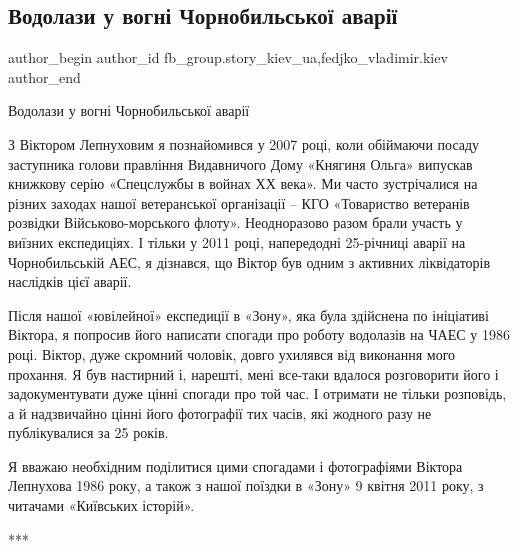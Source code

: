  
 
 
 
 
 
\subsection{Водолази у вогні Чорнобильської аварії}
\label{sec:02_12_2021.fb.fb_group.story_kiev_ua.1.vodolazy_chernobyl}
 
\ifcmt
 author_begin
   author_id fb_group.story_kiev_ua,fedjko_vladimir.kiev
 author_end
\fi

Водолази у вогні Чорнобильської аварії

З Віктором Лепнуховим я познайомився у 2007 році, коли обіймаючи посаду
заступника голови правління Видавничого Дому «Княгиня Ольга» випускав книжкову
серію «Спецслужбы в войнах ХХ века». Ми часто зустрічалися на різних заходах
нашої ветеранської організації – КГО «Товариство ветеранів розвідки
Військово-морського флоту». Неодноразово разом брали участь у виїзних
експедиціях. І тільки у 2011 році, напередодні 25-річниці аварії на
Чорнобильській АЕС, я дізнався, що Віктор був одним з активних ліквідаторів
наслідків цієї аварії. 

Після нашої «ювілейної» експедиції в «Зону», яка була здійснена по ініціативі
Віктора, я попросив його написати спогади про роботу водолазів на ЧАЕС у 1986
році. Віктор, дуже скромний чоловік, довго ухилявся від виконання мого
прохання. Я був настирний і, нарешті, мені все-таки вдалося розговорити його і
задокументувати дуже цінні спогади про той час. І отримати не тільки розповідь,
а й надзвичайно цінні його фотографії тих часів, які жодного разу не
публікувалися за 25 років.

Я вважаю необхідним поділитися цими спогадами і фотографіями Віктора Лепнухова
1986 року, а також з нашої поїздки в «Зону» 9 квітня 2011 року, з читачами
«Київських історій».

***

